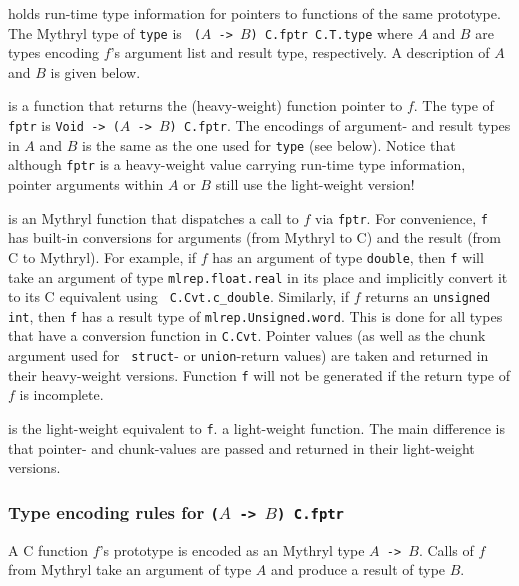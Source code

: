 \begin{description}\setlength{\itemsep}{0pt}
\item[{\tt my type}] holds run-time type information for pointers to
  functions of the same prototype.  The Mythryl type of {\tt type} is {\tt
    ($A$ -> $B$) C.fptr C.T.type} where $A$ and $B$ are types encoding
  $f$'s argument list and result type, respectively.  A
  description of $A$ and $B$ is given below.
\item[{\tt my fptr}] is a function that returns the (heavy-weight)
  function pointer to $f$. The type of {\tt fptr} is {\tt Void -> ($A$
    -> $B$) C.fptr}.  The encodings of argument- and result types in
  $A$ and $B$ is the same as the one used for {\tt type} (see below).
  Notice that although {\tt fptr} is a heavy-weight value carrying
  run-time type information, pointer arguments within $A$ or $B$ still
  use the light-weight version!
\item[!{\tt my f}] is an Mythryl function that dispatches a call to $f$
  via {\tt fptr}.  For convenience, {\tt f} has built-in conversions
  for arguments (from Mythryl to C) and the result (from C to Mythryl).  For
  example, if $f$ has an argument of type {\tt double}, then {\tt f}
  will take an argument of type {\tt mlrep.float.real} in its place and
  implicitly convert it to its C equivalent using {\tt
    C.Cvt.c\_double}.  Similarly, if $f$ returns an {\tt unsigned
    int}, then {\tt f} has a result type of {\tt mlrep.Unsigned.word}.
  This is done for all types that have a conversion function in
  {\tt C.Cvt}.
  Pointer values (as well as the chunk argument used for {\tt
    struct}- or {\tt union}-return values) are taken and returned in
  their heavy-weight versions.  Function {\tt f} will not be generated
  if the return type of $f$ is incomplete.
\item[{\tt my f'}] is the light-weight equivalent to {\tt f}.  a
  light-weight function.  The main difference is that pointer- and
  chunk-values are passed and returned in their light-weight
  versions.
\end{description}

\subsubsection*{Type encoding rules for {\tt ($A$ -> $B$) C.fptr}}

A C function $f$'s prototype is encoded as an Mythryl type {\tt $A$ ->
  $B$}.  Calls of $f$ from Mythryl take an argument of type $A$ and
produce a result of type $B$.

